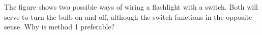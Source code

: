         The figure shows two possible ways of wiring a flashlight
        with a switch. Both will serve to turn the bulb on and off,
        although the switch functions in the opposite sense.  Why is
        method 1 preferable?
